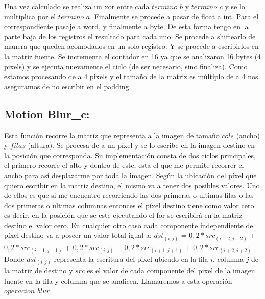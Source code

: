 \documentclass[a4paper]{article}
\begin{document}
Una vez calculado se realiza un xor entre cada $termino\_b$ y  $termino\_c$ y se lo multiplica por el $termino\_a$. Finalmente se procede a pasar de float a int. Para el correspondiente pasaje a word, y finalmente a byte. De esta forma tengo en la parte baja de los registros el resultado para cada uno. Se procede a shiftearlo de manera que queden acomodados en un solo registro. Y se procede a escribirlos en la matriz fuente. Se incrementa el contador en 16 ya que se analizaron 16 bytes (4 pixels) y se ejecuta nuevamente el ciclo (de ser necesario, sino finaliza). Como estamos procesando de a 4 pixels y el tamaño de la matriz es múltiplo de a 4 nos aseguramos de no escribir en el padding.

\newpage


%


\subsection{Motion Blur\_c:}

Esta función recorre la matriz que representa a la imagen de tamaño $cols$ (ancho) y $filas$ (altura). Se procesa de a un píxel y se lo escribe en la imagen destino en
 la posición que corresponda. Su implementación consta de dos ciclos principales, el primero recorre el alto y dentro de este, esta el que me permite recorrer el ancho para así desplazarme por  toda la imagen.
 Según la ubicación del píxel que quiero escribir en la matriz destino, el mismo va a tener dos posibles valores. Uno de ellos es que si me encuentro recorriendo las dos primeras o ultimas filas o las dos primeras o ultimas columnas entonces el píxel destino tiene como valor cero es decir, en la posición que se este ejecutando el for se escribirá en la matriz destino el valor cero. En cualquier otro caso cada componente independiente del píxel destino va a poseer un valor total igual a:\newline \newline
$ dst_{(i,j)}$ = $0,2*src_{(i-2,j-2)}$ + $0,2*src_{(i-1,j-1)}$ + $0,2*src_{(i,j)}$ + $0,2*src_{(i+1,j+1)}$ + $0,2*src_{(i+2,j+2)}$ \newline \newline
Donde $ dst_{(i,j)}$ representa la escritura del pixel ubicado en la fila $i$, columna $j$ de la matriz de destino y $src$ es el valor de cada componente del pixel de la imagen fuente en la fila y columna que se analicen. Llamaremos a esta operación $operacion\_blur$
\end{document}

